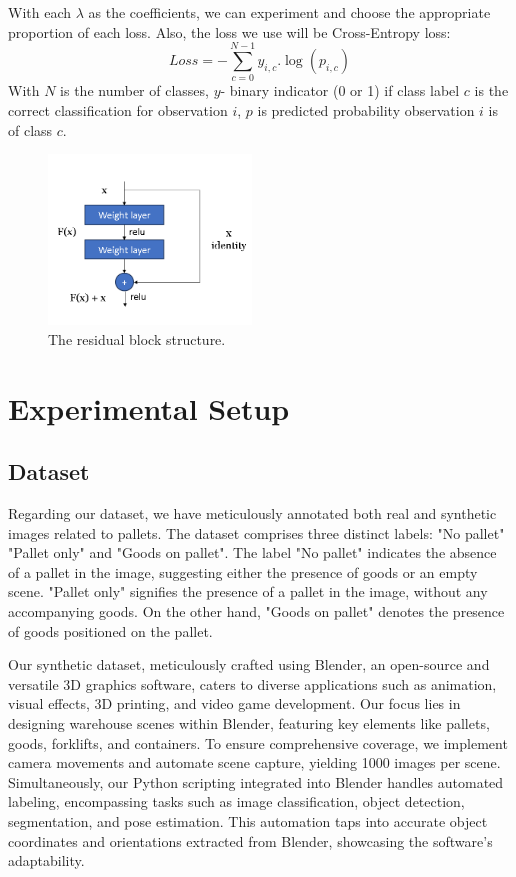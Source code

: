 \documentclass[sigconf,authordraft]{acmart}
\begin{document}
\noindent With each \(\lambda\) as the coefficients, we can experiment and choose the appropriate proportion of each loss. Also, the loss we use will be Cross-Entropy loss:
\begin{equation}
    Loss = -\sum_{c=0}^{N-1} y_{i, c}.\log(p_{i, c})
\end{equation}
With \(N\) is the number of classes, \(y\)- binary indicator (0 or 1) if class label \(c\) is the correct classification for observation  \(i\), \(p\) is predicted probability observation \(i\) is of class \(c\).

\begin{figure}[h]
  \centering
  \includegraphics[width=0.48\textwidth]{images/res_block.png}
  \caption{The residual block structure.}
  \label{fig:your-image}
\end{figure}


\section{Experimental Setup}

\subsection{Dataset}
Regarding our dataset, we have meticulously annotated both real and synthetic images related to pallets. The dataset comprises three distinct labels: "No pallet" "Pallet only" and "Goods on pallet". The label "No pallet" indicates the absence of a pallet in the image, suggesting either the presence of goods or an empty scene. "Pallet only" signifies the presence of a pallet in the image, without any accompanying goods. On the other hand, "Goods on pallet" denotes the presence of goods positioned on the pallet.

\noindent Our synthetic dataset, meticulously crafted using Blender, an open-source and versatile 3D graphics software, caters to diverse applications such as animation, visual effects, 3D printing, and video game development. Our focus lies in designing warehouse scenes within Blender, featuring key elements like pallets, goods, forklifts, and containers. To ensure comprehensive coverage, we implement camera movements and automate scene capture, yielding 1000 images per scene. Simultaneously, our Python scripting integrated into Blender handles automated labeling, encompassing tasks such as image classification, object detection, segmentation, and pose estimation. This automation taps into accurate object coordinates and orientations extracted from Blender, showcasing the software's adaptability.
\end{document}
